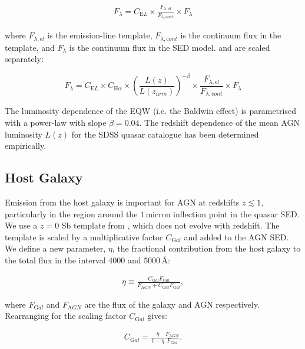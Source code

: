 \begin{eqnarray}
  F_{\lambda} =  C_{\mathrm EL} \times \frac{F_{\lambda, \mathrm el}}{F_{\lambda, \mathrm cont}} \times F_{\lambda} 
\end{eqnarray} 

where $F_{\lambda, \mathrm el}$ is the emission-line template, $F_{\lambda,\mathrm cont}$ is the continuum flux in the template, and $F_{\lambda}$ is the continuum flux in the SED model.  
\ha and \hb are scaled separately: 

\begin{equation}
  F_{\lambda} =  C_{\mathrm EL} \times C_{{\mathrm H} \alpha} \times \left( \frac{L(z)} {L(z_{\mathrm nrm})} \right)^{-\beta} \times \frac{F_{\lambda, \mathrm el}}{F_{\lambda, \mathrm cont}} \times F_{\lambda} 
\end{equation}

The luminosity dependence of the \ha EQW (i.e. the Baldwin effect) is parametrised with a power-law with slope $\beta=0.04$.
The redshift dependence of the mean AGN luminosity $L(z)$ for the SDSS quasar catalogue has been determined empirically.

\subsection{Host Galaxy}

Emission from the host galaxy is important for AGN at redshifts $z\lesssim1$, particularly in the region around the $1$\,micron inflection point in the quasar SED. 
We use a $z=0$ Sb template from \citet{mannucci01}, which does not evolve with redshift.
The template is scaled by a multiplicative factor $C_{\mathrm Gal}$ and added to the AGN SED. 
We define a new parameter, $\eta$, the fractional contribution from the host galaxy to the total flux in the interval $4000$ and $5000$\,\AA:

\begin{eqnarray}
  \eta \equiv \frac{C_{\mathrm Gal}F_{\mathrm Gal}}{F_{\mathrm AGN} + C_{\mathrm Gal}F_{\mathrm Gal}},
\end{eqnarray}

where $F_{\mathrm Gal}$ and $F_{\mathrm AGN}$ are the flux of the galaxy and AGN respectively. 
Rearranging for the scaling factor $C_{\mathrm Gal}$ gives:

\begin{eqnarray}
  C_{\mathrm Gal} = \frac{\eta}{1 - \eta} \frac{F_{\mathrm AGN}}{F_{\mathrm Gal}}.
\end{eqnarray}

